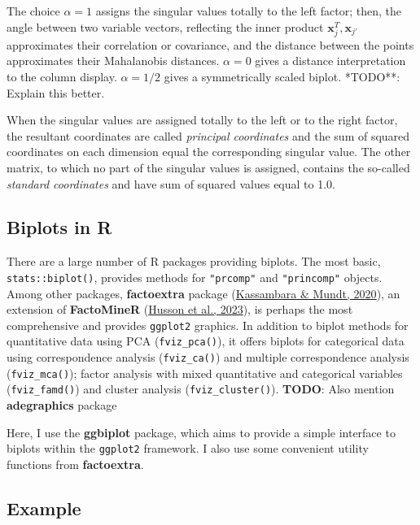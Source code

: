 \documentclass[
  letterpaper,
  10pt,
  krantz2]{krantz}
\begin{document}
The choice \(\alpha = 1\) assigns the singular values totally to the
left factor; then, the angle between two variable vectors, reflecting
the inner product \(\mathbf{x}_j^T, \mathbf{x}_{j'}\) approximates their
correlation or covariance, and the distance between the points
approximates their Mahalanobis distances. \(\alpha = 0\) gives a
distance interpretation to the column display. \(\alpha = 1/2\) gives a
symmetrically scaled biplot. *TODO**: Explain this better.

When the singular values are assigned totally to the left or to the
right factor, the resultant coordinates are called \emph{principal
coordinates} and the sum of squared coordinates on each dimension equal
the corresponding singular value. The other matrix, to which no part of
the singular values is assigned, contains the so-called \emph{standard
coordinates} and have sum of squared values equal to 1.0.

\hypertarget{biplots-in-r}{%
\subsection{Biplots in R}\label{biplots-in-r}}

There are a large number of R packages providing biplots. The most
basic, \texttt{stats::biplot()}, provides methods for \texttt{"prcomp"}
and \texttt{"princomp"} objects. Among other packages,
\textbf{factoextra} package
(\protect\hyperlink{ref-R-factoextra}{Kassambara \& Mundt, 2020}), an
extension of \textbf{FactoMineR}
(\protect\hyperlink{ref-R-FactoMineR}{Husson et al., 2023}), is perhaps
the most comprehensive and provides \texttt{ggplot2} graphics. In
addition to biplot methods for quantitative data using PCA
(\texttt{fviz\_pca()}), it offers biplots for categorical data using
correspondence analysis (\texttt{fviz\_ca()}) and multiple
correspondence analysis (\texttt{fviz\_mca()}); factor analysis with
mixed quantitative and categorical variables (\texttt{fviz\_famd()}) and
cluster analysis (\texttt{fviz\_cluster()}). \textbf{TODO}: Also mention
\textbf{adegraphics} package

Here, I use the \textbf{ggbiplot} package, which aims to provide a
simple interface to biplots within the \texttt{ggplot2} framework. I
also use some convenient utility functions from \textbf{factoextra}.

\hypertarget{example}{%
\subsection{Example}\label{example}}
\end{document}
